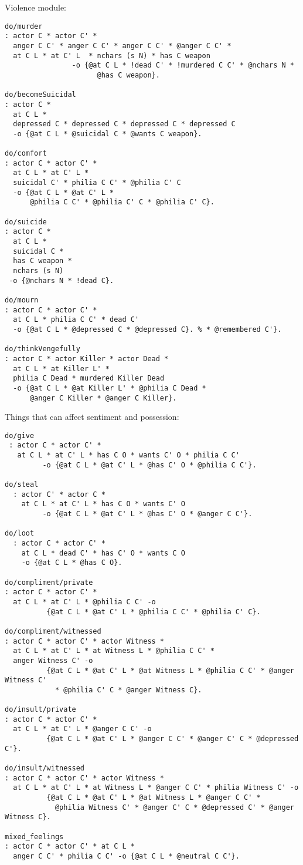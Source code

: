 \documentclass[letterpaper]{article}
\begin{document}
Violence module:
\begin{verbatim}
do/murder 
: actor C * actor C' *
  anger C C' * anger C C' * anger C C' * @anger C C' *
  at C L * at C' L  * nchars (s N) * has C weapon
                -o {@at C L * !dead C' * !murdered C C' * @nchars N *
                      @has C weapon}.

do/becomeSuicidal
: actor C *
  at C L *
  depressed C * depressed C * depressed C * depressed C
  -o {@at C L * @suicidal C * @wants C weapon}.

do/comfort
: actor C * actor C' *
  at C L * at C' L *
  suicidal C' * philia C C' * @philia C' C
  -o {@at C L * @at C' L * 
      @philia C C' * @philia C' C * @philia C' C}.

do/suicide
: actor C * 
  at C L * 
  suicidal C *
  has C weapon *
  nchars (s N)
 -o {@nchars N * !dead C}. 

do/mourn 
: actor C * actor C' *
  at C L * philia C C' * dead C' 
  -o {@at C L * @depressed C * @depressed C}. % * @remembered C'}.

do/thinkVengefully
: actor C * actor Killer * actor Dead *
  at C L * at Killer L' * 
  philia C Dead * murdered Killer Dead
  -o {@at C L * @at Killer L' * @philia C Dead *
      @anger C Killer * @anger C Killer}.

\end{verbatim}

Things that can affect sentiment and possession:
\begin{verbatim}
do/give
 : actor C * actor C' *
   at C L * at C' L * has C O * wants C' O * philia C C'
         -o {@at C L * @at C' L * @has C' O * @philia C C'}.

do/steal
  : actor C' * actor C * 
    at C L * at C' L * has C O * wants C' O
         -o {@at C L * @at C' L * @has C' O * @anger C C'}.

do/loot
  : actor C * actor C' *
    at C L * dead C' * has C' O * wants C O
    -o {@at C L * @has C O}.

do/compliment/private
: actor C * actor C' *
  at C L * at C' L * @philia C C' -o
          {@at C L * @at C' L * @philia C C' * @philia C' C}.

do/compliment/witnessed
: actor C * actor C' * actor Witness *
  at C L * at C' L * at Witness L * @philia C C' *
  anger Witness C' -o
          {@at C L * @at C' L * @at Witness L * @philia C C' * @anger Witness C'  
            * @philia C' C * @anger Witness C}.

do/insult/private
: actor C * actor C' *
  at C L * at C' L * @anger C C' -o
          {@at C L * @at C' L * @anger C C' * @anger C' C * @depressed C'}.

do/insult/witnessed
: actor C * actor C' * actor Witness *
  at C L * at C' L * at Witness L * @anger C C' * philia Witness C' -o
          {@at C L * @at C' L * @at Witness L * @anger C C' * 
            @philia Witness C' * @anger C' C * @depressed C' * @anger Witness C}.

mixed_feelings 
: actor C * actor C' * at C L * 
  anger C C' * philia C C' -o {@at C L * @neutral C C'}.
\end{verbatim}
\end{document}
